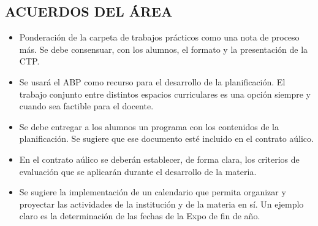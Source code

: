 \documentclass[a4paper]{article}
\begin{document}
\subsection*{ACUERDOS DEL ÁREA}
\begin{itemize}
    \item Ponderación de la carpeta de trabajos prácticos como una nota de proceso más. Se debe consensuar, con los alumnos, el formato y la presentación de la CTP.
    \item Se usará el ABP como recurso para el desarrollo de la planificación. El trabajo conjunto entre distintos espacios curriculares es una opción siempre y cuando sea factible para el docente. 
    \item Se debe entregar a los alumnos un programa con los contenidos de la planificación. Se sugiere que ese documento esté incluido en el contrato aúlico.
    \item En el contrato aúlico se deberán establecer, de forma clara, los criterios de evaluación que se aplicarán durante el desarrollo de la materia. 
    \item Se sugiere la implementación de un calendario que permita organizar y proyectar las actividades de la institución y de la materia en sí. Un ejemplo claro es la determinación de las fechas de la Expo de fin de año. 
\end{itemize}

  
\clearpage


\end{document}
